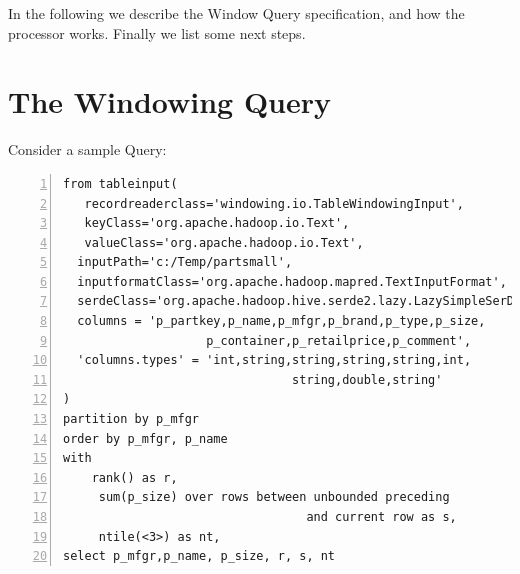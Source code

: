 \documentclass[pdftex,10pt,a4paper]{article}
\begin{document}
In the following we describe the Window Query specification, and how the processor works. Finally we list some next steps.

  \section{The Windowing Query}
  Consider a sample Query:
  
    {\small
   \lstset{keywordstyle=\bfseries\underbar, emphstyle=\underbar,
     language=SQL, showspaces=false, showstringspaces=false}
   \begin{lstlisting}[caption={A sample Query},frame=shadowbox, numbers=left]
 from tableinput(
   recordreaderclass='windowing.io.TableWindowingInput',
   keyClass='org.apache.hadoop.io.Text', 
   valueClass='org.apache.hadoop.io.Text',
  inputPath='c:/Temp/partsmall',
  inputformatClass='org.apache.hadoop.mapred.TextInputFormat',
  serdeClass='org.apache.hadoop.hive.serde2.lazy.LazySimpleSerDe',
  columns = 'p_partkey,p_name,p_mfgr,p_brand,p_type,p_size,
                    p_container,p_retailprice,p_comment',
  'columns.types' = 'int,string,string,string,string,int,
                                string,double,string'
)
partition by p_mfgr
order by p_mfgr, p_name
with
  	rank() as r,
 	 sum(p_size) over rows between unbounded preceding 
 	                              and current row as s,
 	 ntile(<3>) as nt,
select p_mfgr,p_name, p_size, r, s, nt
   \end{lstlisting}
   }
  
\end{document}

